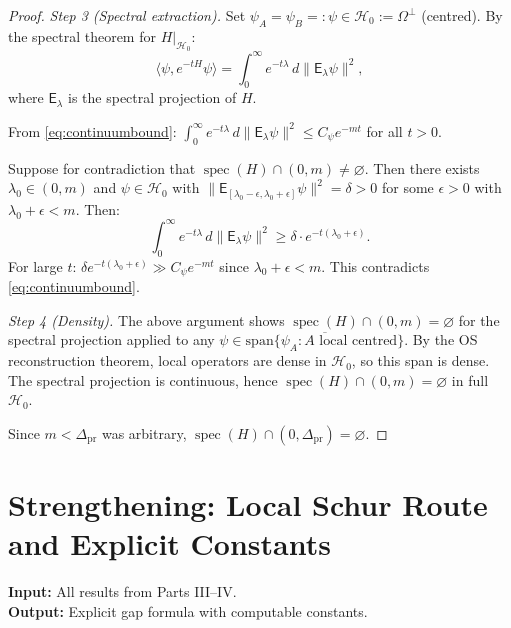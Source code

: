 \documentclass[12pt]{article}
\theoremstyle{plain}
\theoremstyle{definition}
\numberwithin{equation}{section}
\newcommand{\spec}{\operatorname{spec}}
\newcommand{\pr}{\mathrm{pr}}
\begin{document}
\begin{proof}
\emph{Step 3 (Spectral extraction).}
Set $\psi_A=\psi_B=:\psi\in\mathcal{H}_0:=\Omega^\perp$ (centred).  By the spectral theorem for $H|_{\mathcal{H}_0}$:
\begin{equation}
\langle\psi,e^{-tH}\psi\rangle = \int_0^\infty e^{-t\lambda}\,d\|\mathsf{E}_\lambda\psi\|^2,
\end{equation}
where $\mathsf{E}_\lambda$ is the spectral projection of $H$.

From \eqref{eq:continuumbound}: $\int_0^\infty e^{-t\lambda}\,d\|\mathsf{E}_\lambda\psi\|^2\leq C_\psi e^{-mt}$ for all $t>0$.

Suppose for contradiction that $\spec(H)\cap(0,m)\neq\varnothing$.  Then there exists $\lambda_0\in(0,m)$ and $\psi\in\mathcal{H}_0$ with $\|\mathsf{E}_{[\lambda_0-\epsilon,\lambda_0+\epsilon]}\psi\|^2=\delta>0$ for some $\epsilon>0$ with $\lambda_0+\epsilon<m$.  Then:
\begin{equation}
\int_0^\infty e^{-t\lambda}\,d\|\mathsf{E}_\lambda\psi\|^2 \geq \delta\cdot e^{-t(\lambda_0+\epsilon)}.
\end{equation}
For large $t$: $\delta e^{-t(\lambda_0+\epsilon)}\gg C_\psi e^{-mt}$ since $\lambda_0+\epsilon<m$.  This contradicts \eqref{eq:continuumbound}.

\emph{Step 4 (Density).}
The above argument shows $\spec(H)\cap(0,m)=\varnothing$ for the spectral projection applied to any $\psi\in\overline{\mathrm{span}\{\psi_A:A\text{ local centred}\}}$.  By the OS reconstruction theorem, local operators are dense in $\mathcal{H}_0$, so this span is dense.  The spectral projection is continuous, hence $\spec(H)\cap(0,m)=\varnothing$ in full $\mathcal{H}_0$.

Since $m<\Delta_{\pr}$ was arbitrary, $\spec(H)\cap(0,\Delta_{\pr})=\varnothing$.
\end{proof}



\part{Strengthening: Local Schur Route and Explicit Constants}

\noindent\textbf{Input:} All results from Parts III--IV.\\
\textbf{Output:} Explicit gap formula with computable constants.
\end{document}
